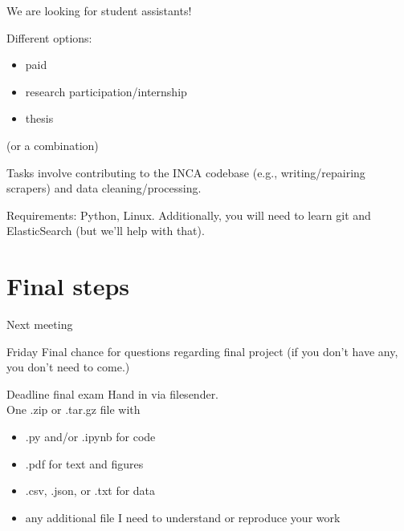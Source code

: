 \documentclass{beamer}
\begin{document}
\begin{frame}[plain]
\end{frame}


\begin{frame}[plain]
\end{frame}


\begin{frame}[plain]
\end{frame}



\begin{frame}[plain]{We are looking for student assistants!}

Different options:
\begin{itemize}
	\item paid
	\item research participation/internship
	\item thesis
\end{itemize}
(or a combination)

\vskip 0.5cm

Tasks involve contributing to the INCA codebase (e.g., writing/repairing scrapers) and data cleaning/processing.

Requirements: Python, Linux. Additionally, you will need to learn git and ElasticSearch (but we'll help with that).

\end{frame}




\section{Final steps}

\begin{frame}{Next meeting}
\begin{block}{Friday}
	Final chance for questions regarding final project (if you don't have any, you don't need to come.)
\end{block}

\begin{block}{Deadline final exam}
Hand in via filesender.\\
One .zip or .tar.gz file with
\begin{itemize}
	\item .py and/or .ipynb for code
	\item .pdf for text and figures
	\item .csv, .json, or .txt for data
	\item any additional file I need to understand or reproduce your work
\end{itemize}
\end{block}

\end{frame}
\end{document}
